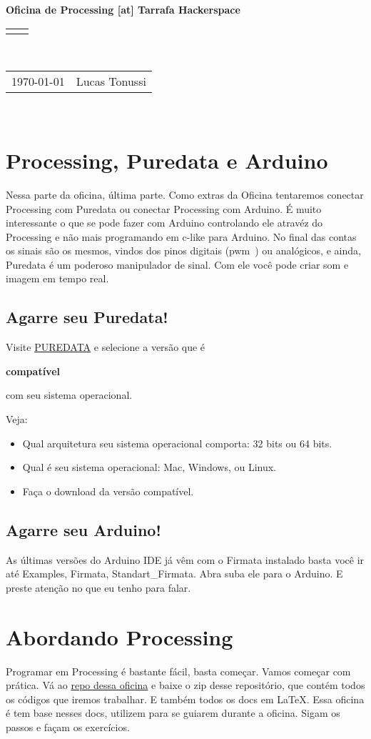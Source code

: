 \documentclass[12pt]{article}
\renewcommand{\title}[1]{\textbf{#1}\\}
\renewcommand{\line}{\begin{tabularx}{\textwidth}{X>{\raggedleft}X}\hline\\\end{tabularx}\\[-0.5cm]}
\newcommand{\leftright}[2]{\begin{tabularx}{\textwidth}{X>{\raggedleft}X}#1%
& #2\\\end{tabularx}\\[-0.5cm]}
\begin{document}
\title{Oficina de Processing [at] Tarrafa Hackerspace}
\line
\leftright{\today}{Lucas Tonussi}

\section{Processing, Puredata e Arduino}

\qquad Nessa parte da oficina, última parte. Como extras da Oficina tentaremos conectar Processing com Puredata ou conectar Processing com Arduino. É muito interessante o que se pode fazer com Arduino controlando ele atravéz do Processing e não mais programando em c-like para Arduino. No final das contas os sinais são os mesmos, vindos dos pinos digitais (pwm~) ou analógicos, e ainda, Puredata é um poderoso manipulador de sinal. Com ele você pode criar som e imagem em tempo real.

\subsection{Agarre seu Puredata!}

\qquad Visite \href{http://puredata.info/downloads}{PUREDATA} e selecione a versão que é \begin{Large}\textbf{compatível}\end{Large} com seu sistema operacional.

\qquad Veja:
\begin{itemize}
\item Qual arquitetura seu sistema operacional comporta: 32 bits ou 64 bits.
\item Qual é seu sistema operacional: Mac, Windows, ou Linux.
\item Faça o download da versão compatível.
\end{itemize}

\subsection{Agarre seu Arduino!}

\qquad As últimas versões do Arduino IDE já vêm com o Firmata instalado basta você ir até Examples, Firmata, Standart\_Firmata. Abra suba ele para o Arduino. E preste atenção no que eu tenho para falar.

\section{Abordando Processing}

\qquad Programar em Processing é bastante fácil, basta começar. Vamos começar com prática. Vá ao \href{https://github.com/tonussi/oficinas/}{repo dessa oficina} e baixe o zip desse repositório, que contém todos os códigos que iremos trabalhar. E também todos os docs em \LaTeX. Essa oficina é tem base nesses docs, utilizem para se guiarem durante a oficina. Sigam os passos e façam os exercícios.
\end{document}
